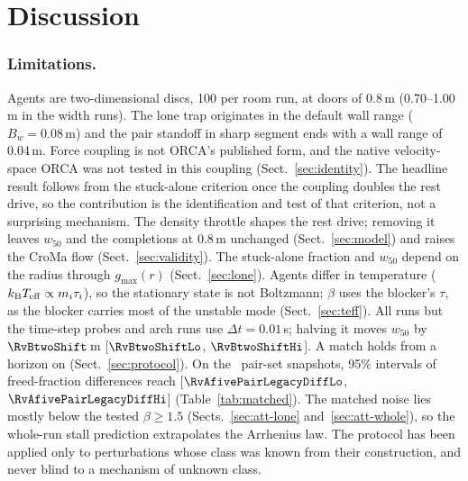\section{Discussion}\label{sec:discussion}
\subsubsection{Limitations.}
Agents are two-dimensional discs, 100 per room run, at doors of 0.8\,m (0.70--1.00\,m in the width runs). The lone trap originates in the default wall range ($B_w=0.08$\,m) and the pair standoff in sharp segment ends with a wall range of 0.04\,m. Force coupling is not ORCA's published form, and the native velocity-space ORCA was not tested in this coupling (Sect.~\ref{sec:identity}). The headline result follows from the stuck-alone criterion once the coupling doubles the rest drive, so the contribution is the identification and test of that criterion, not a surprising mechanism. The density throttle shapes the rest drive; removing it leaves $w_{50}$ and the completions at 0.8\,m unchanged (Sect.~\ref{sec:model}) and raises the CroMa flow (Sect.~\ref{sec:validity}). The stuck-alone fraction and $w_{50}$ depend on the radius through $g_{\max}(r)$ (Sect.~\ref{sec:lone}). Agents differ in temperature ($k_{\rm B}T_{\rm eff}\propto m_i\tau_i$), so the stationary state is not Boltzmann; $\beta$ uses the blocker's $\tau$, as the blocker carries most of the unstable mode (Sect.~\ref{sec:teff}). All runs but the time-step probes and arch runs use $\Delta t=0.01$\,s; halving it moves $w_{50}$ by $\RvBtwoShift$\,m [$\RvBtwoShiftLo$, $\RvBtwoShiftHi$]. A match holds from a horizon on (Sect.~\ref{sec:protocol}). On the \PairN\ pair-set snapshots, 95\% intervals of freed-fraction differences reach [$\RvAfivePairLegacyDiffLo$, $\RvAfivePairLegacyDiffHi$] (Table~\ref{tab:matched}). The matched noise lies mostly below the tested $\beta\ge1.5$ (Sects.~\ref{sec:att-lone} and~\ref{sec:att-whole}), so the whole-run stall prediction extrapolates the Arrhenius law. The protocol has been applied only to perturbations whose class was known from their construction, and never blind to a mechanism of unknown class.

